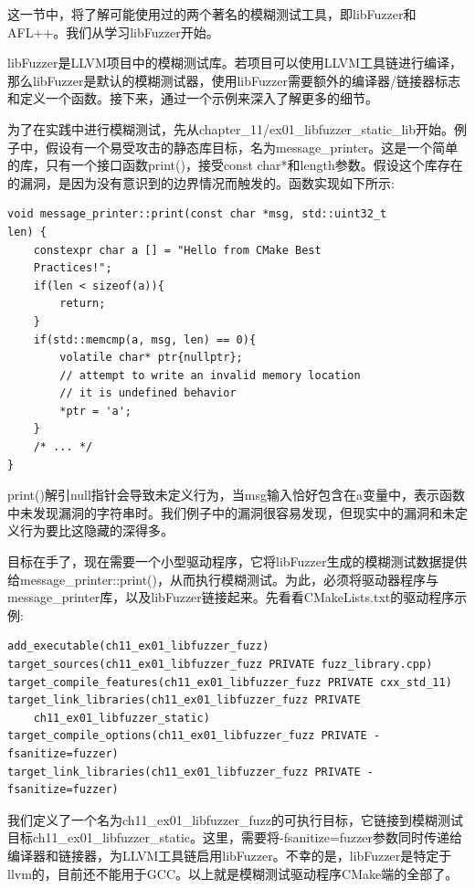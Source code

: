 
这一节中，将了解可能使用过的两个著名的模糊测试工具，即libFuzzer和AFL++。我们从学习libFuzzer开始。


libFuzzer是LLVM项目中的模糊测试库。若项目可以使用LLVM工具链进行编译，那么libFuzzer是默认的模糊测试器，使用libFuzzer需要额外的编译器/链接器标志和定义一个函数。接下来，通过一个示例来深入了解更多的细节。

为了在实践中进行模糊测试，先从chapter\_11/ex01\_libfuzzer\_static\_lib开始。例子中，假设有一个易受攻击的静态库目标，名为message\_printer。这是一个简单的库，只有一个接口函数print()，接受const char*和length参数。假设这个库存在的漏洞，是因为没有意识到的边界情况而触发的。函数实现如下所示:

\begin{lstlisting}[style=styleCXX]
void message_printer::print(const char *msg, std::uint32_t
len) {
	constexpr char a [] = "Hello from CMake Best
	Practices!";
	if(len < sizeof(a)){
		return;
	}
	if(std::memcmp(a, msg, len) == 0){
		volatile char* ptr{nullptr};
		// attempt to write an invalid memory location
		// it is undefined behavior
		*ptr = 'a';
	}
	/* ... */
}
\end{lstlisting}

print()解引null指针会导致未定义行为，当msg输入恰好包含在a变量中，表示函数中未发现漏洞的字符串时。我们例子中的漏洞很容易发现，但现实中的漏洞和未定义行为要比这隐藏的深得多。

目标在手了，现在需要一个小型驱动程序，它将libFuzzer生成的模糊测试数据提供给message\_printer::print()，从而执行模糊测试。为此，必须将驱动器程序与message\_printer库，以及libFuzzer链接起来。先看看CMakeLists.txt的驱动程序示例:

\begin{lstlisting}[style=styleCMake]
add_executable(ch11_ex01_libfuzzer_fuzz)
target_sources(ch11_ex01_libfuzzer_fuzz PRIVATE	fuzz_library.cpp)
target_compile_features(ch11_ex01_libfuzzer_fuzz PRIVATE cxx_std_11)
target_link_libraries(ch11_ex01_libfuzzer_fuzz PRIVATE 
	ch11_ex01_libfuzzer_static)
target_compile_options(ch11_ex01_libfuzzer_fuzz PRIVATE -fsanitize=fuzzer)
target_link_libraries(ch11_ex01_libfuzzer_fuzz PRIVATE -fsanitize=fuzzer)
\end{lstlisting}

我们定义了一个名为ch11\_ex01\_libfuzzer\_fuzz的可执行目标，它链接到模糊测试目标ch11\_ex01\_libfuzzer\_static。这里，需要将-fsanitize=fuzzer参数同时传递给编译器和链接器，为LLVM工具链启用libFuzzer。不幸的是，libFuzzer是特定于llvm的，目前还不能用于GCC。以上就是模糊测试驱动程序CMake端的全部了。

